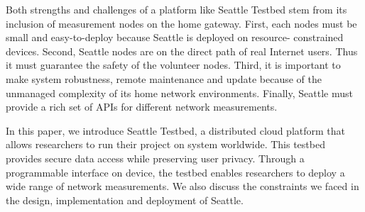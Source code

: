 Both strengths and challenges of a platform like Seattle Testbed stem from 
its inclusion of measurement nodes on the home gateway. First, each nodes 
must be small and easy-to-deploy because Seattle is deployed on resource-
constrained devices. Second, Seattle nodes are on the direct path of real 
Internet users. Thus it must guarantee the safety of the volunteer nodes. 
Third, it is important to make system robustness, remote maintenance and 
update because of the unmanaged complexity of its home network environments. 
Finally, Seattle must provide a rich set of APIs for different network 
measurements.

In this paper, we introduce Seattle Testbed, a distributed cloud platform 
that allows researchers to run their project on system worldwide. This 
testbed provides secure data access while preserving user privacy. Through a 
programmable interface on device, the testbed enables researchers to deploy 
a wide range of network measurements. We also discuss the constraints we 
faced in the design, implementation and deployment of Seattle.
